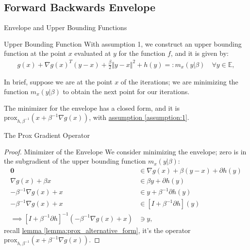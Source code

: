 \documentclass[11pt]{beamer}
\begin{document}
    \subsection{Forward Backwards Envelope}
        \begin{frame}{Envelope and Upper Bounding Functions}
            \begin{block}{Upper Bounding Function}
                With assumption 1, we construct an upper bounding function at the point $x$ evaluated at $y$ for the function $f$, and it is given by: 
                \begin{align*}
                    g(x) + \nabla g(x)^T(y - x) + \frac{\beta}{2} \Vert y - x\Vert^2
                    + h(y) =: m_x(y|\beta) \quad \forall y \in \mathbb E, 
                \end{align*}    
            \end{block}
            In brief, suppose we are at the point $x$ of the iterations; we are minimizing the function $m_x(y|\beta)$ to obtain the next point for our iterations.
            \begin{theorem}\label{thm:minimizer_envelope}
                The minimizer for the envelope has a closed form, and it is $\text{prox}_{h, \beta^{-1}}(x + \beta^{-1}\nabla g(x))$, with \hyperref[assumption:1]{assumption \ref*{assumption:1}}. 
            \end{theorem}
        \end{frame}
        \begin{frame}{The Prox Gradient Operator}
            \begin{proof}{Minimizer of the Envelope}
                We consider minimizing the envelope; zero is in the subgradient of the upper bounding function $m_x(y|\beta)$: 
                \begin{align*}
                    \mathbf 0 &\in 
                    \nabla g(x) + {\beta}(y - x) + \partial h(y)
                    \\
                    \nabla g(x) + \beta x & \in
                    \beta y + \partial h(y)
                    \\
                    -\beta^{-1} \nabla g(x) + x &\in y + \beta^{-1} \partial h(y)
                    \\
                    -\beta^{-1} \nabla g(x) + x &\in [I + \beta^{-1} \partial h](y)
                    \\
                    \implies
                    [I + \beta^{-1}\partial h]^{-1}(- \beta^{-1} \nabla g(x) + x) 
                    & \ni y,
                \end{align*}
                recall \hyperref[lemma:prox_alternative_form]{lemma \ref*{lemma:prox_alternative_form}}, it's the operator $\text{prox}_{h, \beta^{-1}}(x + \beta^{-1}\nabla g(x))$. 
            \end{proof}
        \end{frame}
\end{document}
